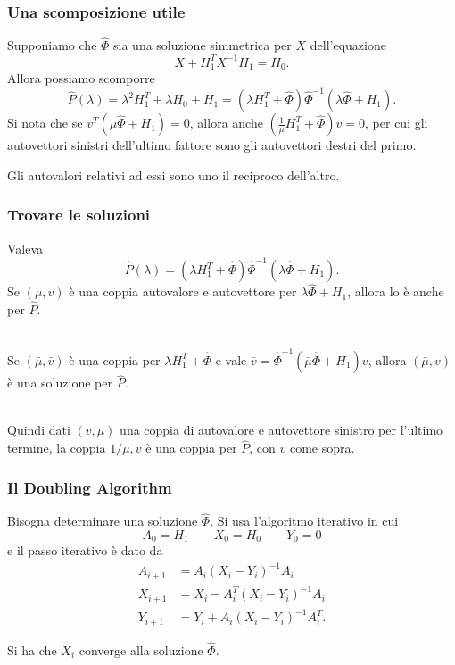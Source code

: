 \documentclass{beamer}
\begin{document}
\begin{frame}
\frametitle{Una scomposizione utile}
    Supponiamo che $\hat{\Phi}$ sia una soluzione simmetrica per $X$
    dell'equazione
    \[
        X + H_1^T X^{-1} H_1 = H_0.
    \]
    Allora possiamo scomporre
    \[
        \hat{P}(\lambda) = \lambda^2 H_1^T + \lambda H_0 + H_1 = 
        (\lambda H_1^T + \hat{\Phi})\hat{\Phi}^{-1}(\lambda \hat{\Phi} + H_1).
    \]
    Si nota che se $v^T(\mu \hat{\Phi} + H_1)=0$, allora anche $\left(
    \frac{1}{\mu}  H_1^T + \hat{\Phi}\right)v=0$,  per cui gli autovettori
    sinistri dell'ultimo fattore sono gli autovettori destri del primo. 

    Gli autovalori relativi ad essi sono uno il reciproco dell'altro.
\end{frame}

\begin{frame}
\frametitle{Trovare le soluzioni}
    Valeva
    \[
        \hat{P}(\lambda) = (\lambda H_1^T + \hat{\Phi})\hat{\Phi}^{-1}(\lambda
        \hat{\Phi} + H_1).
    \]
    Se $(\mu, v)$ \`e una coppia autovalore e autovettore per $\lambda
    \hat{\Phi} + H_1$, allora lo \`e anche per $\hat{P}$. \\~\

    Se $(\bar{\mu}, \bar{v})$ \`e una coppia per $\lambda H_1^T + \hat{\Phi}$ e
    vale $\bar{v} = \hat{\Phi}^{-1}(\bar{\mu} \hat{\Phi} + H_1)v$, allora
    $(\bar{\mu}, v)$ \`e una soluzione per $\hat{P}$. \\~\

    Quindi dati $(\bar{v}, \mu)$ una coppia di autovalore e autovettore sinistro
    per l'ultimo termine, la coppia $1/\mu, v$ \`e una coppia per $\hat{P}$,
    con $v$ come sopra.
\end{frame}

\begin{frame}
\frametitle{Il Doubling Algorithm}
    Bisogna determinare una soluzione $\hat{\Phi}$. Si usa l'algoritmo iterativo in
    cui
    \[
        A_0 = H_1 \qquad X_0 = H_0 \qquad Y_0 = 0
    \]
    e il  passo iterativo \`e dato da
    \begin{align*}
        A_{i+1} &= A_i(X_i-Y_i)^{-1}A_i \\
        X_{i+1} &= X_i - A_i^T(X_i-Y_i)^{-1}A_i \\
        Y_{i+1} &= Y_i + A_i(X_i-Y_i)^{-1}A_i^T.
    \end{align*}

    Si ha che $X_i$ converge alla soluzione $\hat{\Phi}$.
\end{frame}
\end{document}

